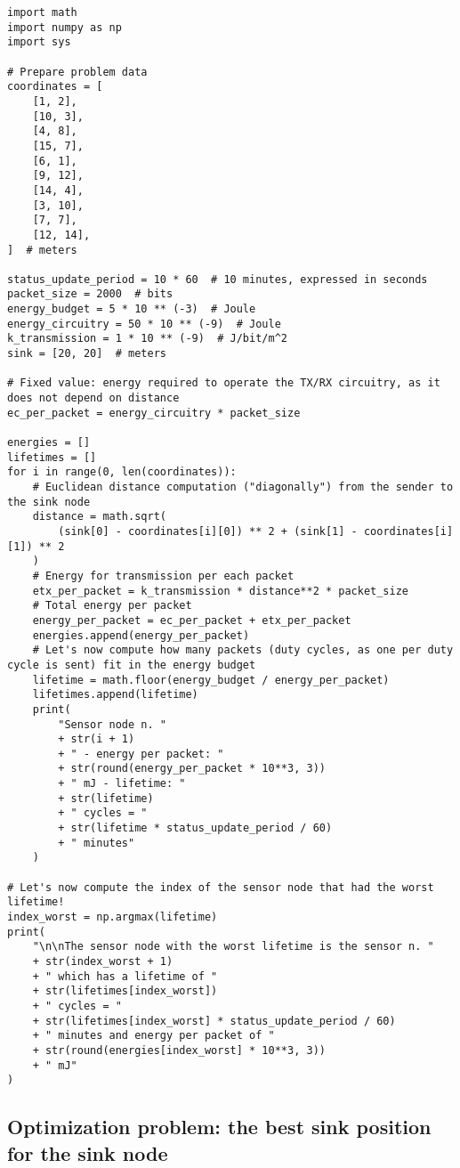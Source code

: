 \documentclass[a4paper,11pt]{article} %
\begin{document}
    \begin{verbatim}
import math
import numpy as np
import sys

# Prepare problem data
coordinates = [
    [1, 2],
    [10, 3],
    [4, 8],
    [15, 7],
    [6, 1],
    [9, 12],
    [14, 4],
    [3, 10],
    [7, 7],
    [12, 14],
]  # meters

status_update_period = 10 * 60  # 10 minutes, expressed in seconds
packet_size = 2000  # bits
energy_budget = 5 * 10 ** (-3)  # Joule
energy_circuitry = 50 * 10 ** (-9)  # Joule
k_transmission = 1 * 10 ** (-9)  # J/bit/m^2
sink = [20, 20]  # meters

# Fixed value: energy required to operate the TX/RX circuitry, as it does not depend on distance
ec_per_packet = energy_circuitry * packet_size

energies = []
lifetimes = []
for i in range(0, len(coordinates)):
    # Euclidean distance computation ("diagonally") from the sender to the sink node
    distance = math.sqrt(
        (sink[0] - coordinates[i][0]) ** 2 + (sink[1] - coordinates[i][1]) ** 2
    )
    # Energy for transmission per each packet
    etx_per_packet = k_transmission * distance**2 * packet_size
    # Total energy per packet
    energy_per_packet = ec_per_packet + etx_per_packet
    energies.append(energy_per_packet)
    # Let's now compute how many packets (duty cycles, as one per duty cycle is sent) fit in the energy budget
    lifetime = math.floor(energy_budget / energy_per_packet)
    lifetimes.append(lifetime)
    print(
        "Sensor node n. "
        + str(i + 1)
        + " - energy per packet: "
        + str(round(energy_per_packet * 10**3, 3))
        + " mJ - lifetime: "
        + str(lifetime)
        + " cycles = "
        + str(lifetime * status_update_period / 60)
        + " minutes"
    )

# Let's now compute the index of the sensor node that had the worst lifetime!
index_worst = np.argmax(lifetime)
print(
    "\n\nThe sensor node with the worst lifetime is the sensor n. "
    + str(index_worst + 1)
    + " which has a lifetime of "
    + str(lifetimes[index_worst])
    + " cycles = "
    + str(lifetimes[index_worst] * status_update_period / 60)
    + " minutes and energy per packet of "
    + str(round(energies[index_worst] * 10**3, 3))
    + " mJ"
)
    \end{verbatim}

    \subsection{Optimization problem: the best sink position for the sink node}\label{subsec:optimization-problem:-the-best-sink-position-for-the-sink-node}
\end{document}

